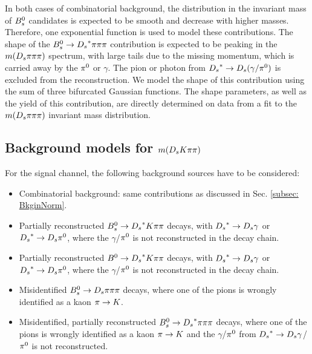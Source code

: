 In both cases of combinatorial background, the distribution in the invariant mass of ${{B}^0_{s}}$ candidates is expected to be smooth and decrease with higher masses. 
Therefore, one exponential function is used to model these contributions. \newline
The shape of the  ${{B}^0_{s}}\rightarrow{\ensuremath{{D}_{s}}}^{*}{\pi}{\pi}{\pi}$ contribution is expected to be peaking in the $m({{D}_{s}}{\pi}{\pi}{\pi})$ spectrum, with large tails due to the missing momentum, which is carried away by the ${{\pi}^0}$ or $\gamma$. 
The pion or photon from ${{D}_{s}}^{*}\rightarrow{\ensuremath{{D}_{s}}}(\gamma/{{\pi}^0})$ is excluded from the reconstruction. 
We model the shape of this contribution using the sum of three bifurcated Gaussian functions.
The shape parameters, 
as well as the yield of this contribution, are directly determined on data from a fit to the $m({{D}_{s}}{\pi}{\pi}{\pi})$ invariant mass distribution. 

\subsection{Background models for $m({{D}_{s}}{K}{\pi}{\pi})$}
For the signal channel, the following background sources have to be considered:

\begin{itemize}

\item Combinatorial background: same contributions as discussed in Sec. \ref{subsec: BkginNorm}.

\item Partially reconstructed ${{B}^0_{s}}\rightarrow{\ensuremath{{D}_{s}}}^{*}{K}{\pi}{\pi}$ decays, with ${{D}_{s}}^{*}\rightarrow{\ensuremath{{D}_{s}}}\gamma$ or ${{D}_{s}}^{*}\rightarrow{\ensuremath{{D}_{s}}}{\ensuremath{{\pi}^0}}$, where the $\gamma$/${{\pi}^0}$ is not reconstructed in the decay chain. 

\item Partially reconstructed ${{B}^0}\rightarrow{\ensuremath{{D}_{s}}}^{*}{K}{\pi}{\pi}$ decays, with ${{D}_{s}}^{*}\rightarrow{\ensuremath{{D}_{s}}}\gamma$ or ${{D}_{s}}^{*}\rightarrow{\ensuremath{{D}_{s}}}{\ensuremath{{\pi}^0}}$, where the $\gamma$/${{\pi}^0}$ is not reconstructed in the decay chain.

\item Misidentified ${{B}^0_{s}}\rightarrow{\ensuremath{{D}_{s}}}{\ensuremath{\pi}}{\ensuremath{\pi}}{\ensuremath{\pi}}$ decays, where one of the pions is wrongly identified as a kaon ${\pi}\rightarrow{\ensuremath{K}}$.  

\item Misidentified, partially reconstructed ${{B}^0_{s}}\rightarrow{\ensuremath{{D}_{s}}}^{*}{\pi}{\pi}{\pi}$ decays, where one of the pions is wrongly identified as a kaon ${\pi}\rightarrow{\ensuremath{K}}$ and the $\gamma$/${{\pi}^0}$ from ${{D}_{s}}^{*}\rightarrow{\ensuremath{{D}_{s}}}\gamma$/${{\pi}^0}$ is 
not reconstructed.

\end{itemize}

